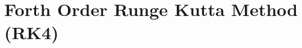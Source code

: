 \documentclass[final,11pt,a4paper,twoside]{article}
\begin{document}
    \section{Forth Order Runge Kutta Method (RK4)}
\end{document}
